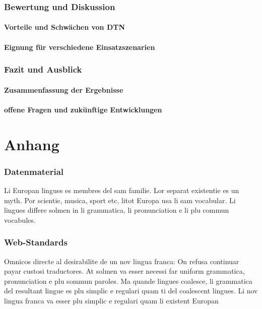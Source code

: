 \documentclass[paper=a4,fontsize=12pt,ngerman]{scrartcl}
\begin{document}
\section{Bewertung und Diskussion}
\subsection{Vorteile und Schwächen von DTN}
\subsection{Eignung für verschiedene Einsatzszenarien}

\section{Fazit und Ausblick}

\subsection{Zusammenfassung der Ergebnisse}

\subsection{offene Fragen und zukünftige Entwicklungen}

\clearpage
\renewcommand\refname{Literaturverzeichnis}




\clearpage
\appendix
\part*{Anhang}

\section{Datenmaterial}
Li Europan lingues es membres del sam familie. Lor separat existentie es un 
myth. Por scientie, musica, sport etc, litot Europa usa li sam vocabular. Li 
lingues differe solmen in li grammatica, li pronunciation e li plu commun 
vocabules.

\section{Web-Standards}
Omnicos directe al desirabilite de un nov lingua franca: On refusa continuar 
payar custosi traductores. At solmen va esser necessi far uniform grammatica, 
pronunciation e plu sommun paroles. Ma quande lingues coalesce, li grammatica 
del resultant lingue es plu simplic e regulari quam ti del coalescent 
lingues. Li nov lingua franca va esser plu simplic e regulari quam li 
existent Europan
\end{document}
